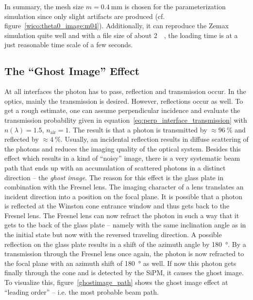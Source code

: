 In summary, the mesh size $m=\SI{0.4}{\milli\meter}$ is chosen for the parameterization simulation since only slight artifacts are produced (cf. figure~\ref{wico:theta0_image:m04}). Additionally, it can reproduce the Zemax simulation quite well and with a file size of about \SI{2}{\mebi\byte}, the loading time is at a just reasonable time scale of a few seconds.

\subsection{The \enquote{Ghost Image} Effect}\label{sec:ghost_image}

At all interfaces the photon has to pass, reflection and transmission occur. In the \iceact optics, mainly the transmission is desired. However, reflections occur as well. To get a rough estimate, one can assume perpendicular incidence and evaluate the transmission probability given in equation~\eqref{eq:perp_interface_transmission} with $n(\lambda)=\num{1.5}$, $n_\text{air}=1$. The result is that a photon is transmitted by $\approx\SI{96}{\percent}$ and reflected by $\approx\SI{4}{\percent}$. Usually, an incidental reflection results in diffuse scattering of the photons and reduces the imaging quality of the optical system. Besides this effect which results in a kind of \enquote{noisy} image, there is a very systematic beam path that ends up with an accumulation of scattered photons in a distinct direction -- the \textit{ghost image}. The reason for this effect is the glass plate in combination with the Fresnel lens. The imaging character of a lens translates an incident direction into a position on the focal plane. It is possible that a photon is reflected at the Winston cone entrance window and thus gets back to the Fresnel lens. The Fresnel lens can now refract the photon in such a way that it gets to the back of the glass plate -- namely with the same inclination angle as in the initial state but now with the reversed traveling direction. A possible reflection on the glass plate results in a shift of the azimuth angle by \SI{180}{\degree}. By a transmission through the Fresnel lens once again, the photon is now refracted to the focal plane with an azimuth shift of \SI{180}{\degree} as well. If now this photon gets finally through the cone and is detected by the SiPM, it causes the ghost image. To visualize this, figure~\ref{ghostimage_path} shows the ghost image effect at \enquote{leading order} -- i.e. the most probable beam path.\\


